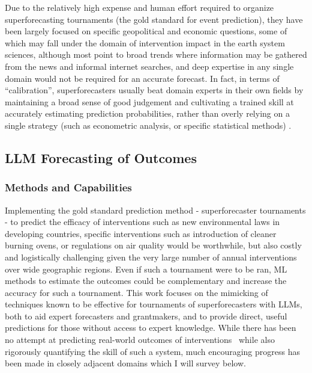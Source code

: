 \documentclass[12pt,a4paper]{article}
\begin{document}
Due to the relatively high expense and human effort required to organize superforecasting tournaments (the gold standard for event prediction), they have been largely focused on specific geopolitical and economic questions, some of which may fall under the domain of intervention impact in the earth system sciences, although most point to broad trends where information may be gathered from the news and informal internet searches, and deep expertise in any single domain would not be required for an accurate forecast. In fact, in terms of ``calibration'', superforecasters usually beat domain experts in their own fields by maintaining a broad sense of good judgement and cultivating a trained skill at accurately estimating prediction probabilities, rather than overly relying on a single strategy (such as econometric analysis, or specific statistical methods) .

\subsection{LLM Forecasting of Outcomes \DOMAINCAPITALIZEDINTERVENTION}

\subsubsection{Methods and Capabilities}
Implementing the gold standard prediction method - superforecaster tournaments - to predict the efficacy of interventions such as new environmental laws in developing countries, specific interventions such as introduction of cleaner burning ovens, or regulations on air quality would be worthwhile, but also costly and logistically challenging given the very large number of annual interventions over wide geographic regions. Even if such a tournament were to be ran, ML methods to estimate the outcomes could be complementary and increase the accuracy for such a tournament. This work focuses on the mimicking of techniques known to be effective for tournaments of superforecasters with LLMs, both to aid expert forecasters and grantmakers, and to provide direct, useful predictions for those without access to expert knowledge. While there has been no attempt at predicting real-world outcomes of interventions \ABSTRACT\ while also rigorously quantifying the skill of such a system, much encouraging progress has been made in closely adjacent domains which I will survey below.
\end{document}
